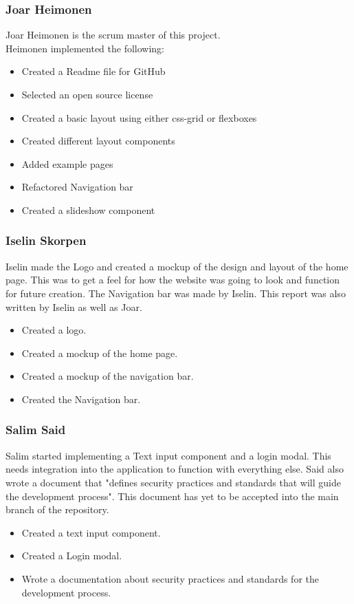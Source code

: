 \documentclass[12pt]{article}
\begin{document}
\subsubsection{Joar Heimonen}
Joar Heimonen is the scrum master of this project.\\
Heimonen implemented the following:
    \begin{itemize}
        \item Created a Readme file for GitHub
        \item Selected an open source license
        \item Created a basic layout using either css-grid or flexboxes
        \item Created different layout components
        \item Added example pages
        \item Refactored Navigation bar
        \item Created a slideshow component
    \end{itemize}
\subsubsection{Iselin Skorpen}
Iselin made the Logo and created a mockup of the design and layout of the home page. This was to get a feel for how the website was 
going to look and function for future creation. The Navigation bar was made by Iselin. This report was also written by 
Iselin as well as Joar.
    \begin{itemize}
        \item Created a logo.
        \item Created a mockup of the home page.
        \item Created a mockup of the navigation bar.
        \item Created the Navigation bar.
    \end{itemize}
\subsubsection{Salim Said}
Salim started implementing a Text input component and a login modal. This needs integration into the application to function with everything 
else. Said also wrote a document that "defines security practices and standards that will guide the development process"\cite*{ShowitDocsSecurity}. 
This document has yet to be accepted into the main branch of the repository.
    \begin{itemize}
        \item Created a text input component.
        \item Created a Login modal.
        \item Wrote a documentation about security practices and standards for the development process.
    \end{itemize}
\end{document}

